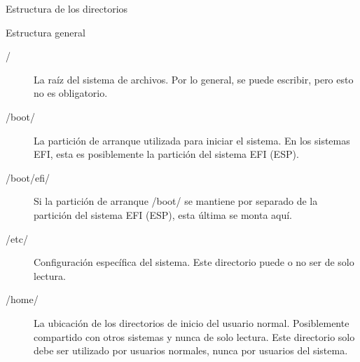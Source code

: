 \begin{frame}[c]{Estructura de los directorios}
\end{frame}

\begin{frame}[c]{Estructura general}
  \begin{description}
    \item [/] La raíz del sistema de archivos. Por lo general, se puede
			escribir, pero esto no es obligatorio.
    \pausa
		\item [/boot/] La partición de arranque utilizada para iniciar el sistema.
			En los sistemas EFI, esta es posiblemente la partición del sistema EFI
			(ESP).
    \pausa
		\item [/boot/efi/] Si la partición de arranque /boot/ se mantiene
			por separado de la partición del sistema EFI (ESP), esta última se monta
			aquí.
    \pausa
		\item [/etc/] Configuración específica del sistema. Este directorio puede
			o no ser de solo lectura.
    \pausa
		\item [/home/] La ubicación de los directorios de inicio del usuario
			normal. Posiblemente compartido con otros sistemas y nunca de solo
			lectura. Este directorio solo debe ser utilizado por usuarios normales,
			nunca por usuarios del sistema.
  \end{description}
\end{frame}

